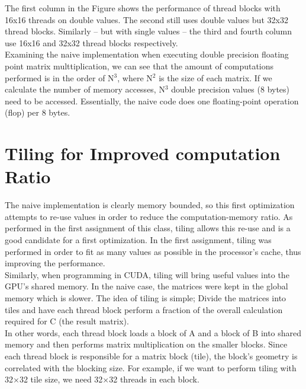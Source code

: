 \documentclass[paper=a4, fontsize=11pt]{scrartcl} %
\numberwithin{equation}{section} %
\numberwithin{figure}{section} %
\numberwithin{table}{section} %
\begin{document}
The first column in the Figure shows the performance of thread blocks with 16x16 threads on double values. The second still uses double values but 32x32 thread blocks. Similarly -- but with single values -- the third and fourth column use 16x16 and 32x32 thread blocks respectively.\\

Examining the naive implementation when executing double precision floating point matrix multtiplication, we can see that the amount of computations performed is in the order of N$^3$, where N$^2$ is the size of each matrix. If we calculate the number of memory accesses, N$^3$ double precision values (8 bytes) need to be accessed. Essentially, the naive code does one floating-point operation (flop) per 8 bytes.

\section{\textbf{Tiling for Improved computation Ratio}}

The naive implementation is clearly memory bounded, so this first optimization attempts to re-use values in order to reduce the computation-memory ratio. As performed in the first assignment of this class, tiling allows this re-use and is a good candidate for a first optimization. In the first assignment, tiling was performed in order to fit as many values as possible in the processor's cache, thus improving the performance.\\ 

Similarly, when programming in CUDA, tiling will bring useful values into the GPU's shared memory. In the naive case, the matrices were kept in the global memory which is slower. The idea of tiling is simple; Divide the matrices into tiles and have each thread block perform a fraction of the overall calculation required for C (the result matrix).\\

In other words, each thread block loads a block of A and a block of B into shared memory and then performs matrix multiplication on the smaller blocks. Since each thread block is responsible for a matrix block (tile), the block's geometry is correlated with the blocking size. For example, if we want to perform tiling with 32$\times$32 tile size, we need 32$\times$32 threads in each block.\\
\end{document}

